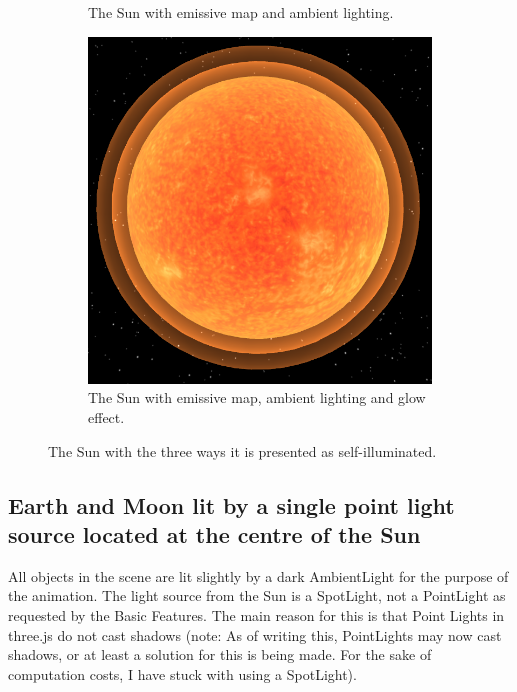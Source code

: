 \documentclass[12pt]{article}
\begin{document}
\begin{figure}[H]
\begin{subfigure}[b]{0.4\textwidth}
                \caption{The Sun with emissive map and ambient lighting.}
                \label{fig:Self-illuminating Sun with emissive map.}
       \end{subfigure}
        \begin{subfigure}[b]{0.4\textwidth}
                \includegraphics[width=\textwidth]{images/sunwithglow}
                \caption{The Sun with emissive map, ambient lighting and glow effect.}
                \label{fig:Self-illuminating Sun with emissive map.}
       \end{subfigure}
        \caption{The Sun with the three ways it is presented as self-illuminated.}\label{fig:Self-illuminated Sun}
\end{figure}

\subsection{Earth and Moon lit by a single point light source located at the centre of the Sun}
All objects in the scene are lit slightly by a dark AmbientLight for the purpose of the animation. The light source from the Sun is a SpotLight, not a PointLight as requested by the Basic Features. The main reason for this is that Point Lights in three.js do not cast shadows (note: As of writing this, PointLights may now cast shadows, or at least a solution for this is being made. For the sake of computation costs, I have stuck with using a SpotLight). 
\end{document}
